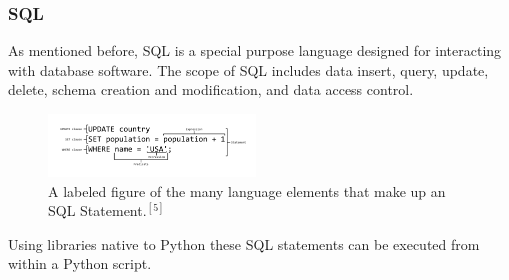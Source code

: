 \documentclass[11pt, a4paper]{article}
\begin{document}
\begin{multicols}{2}
\subsubsection{SQL}
As mentioned before, SQL is a special purpose language designed for interacting with database software. The scope of SQL includes data insert, query, update, delete, schema creation and modification, and data access control.
\begin{figure}[H]
\includegraphics[width = 5.5cm]{sql}
\centering
\caption{\footnotesize A labeled figure of the many language elements that make up an SQL Statement.$^{[5]}$}
\end{figure}
Using libraries native to Python these SQL statements can be executed from within a Python script.

\end{multicols}
\end{document}
